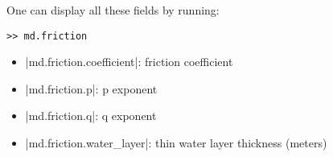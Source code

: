 One can display all these fields by running:
\begin{lstlisting}
>> md.friction
\end{lstlisting}
\begin{itemize}
	\item \lstinlinebg|md.friction.coefficient|: friction coefficient
	\item \lstinlinebg|md.friction.p|: p exponent
	\item \lstinlinebg|md.friction.q|: q exponent
	\item \lstinlinebg|md.friction.water_layer|: thin water layer thickness (meters)
\end{itemize}

\clearpage %
